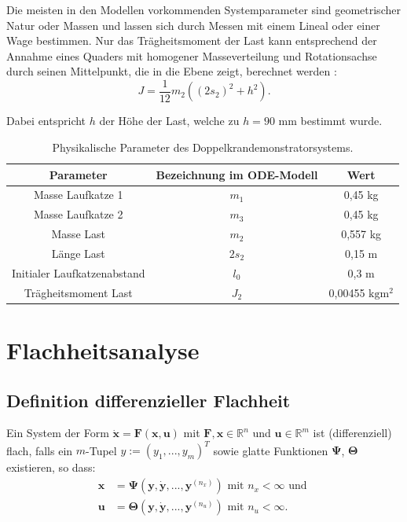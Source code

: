 Die meisten in den Modellen vorkommenden Systemparameter sind geometrischer Natur oder Massen und lassen sich durch Messen mit einem Lineal oder einer Wage bestimmen. Nur das Trägheitsmoment der Last kann entsprechend der Annahme eines Quaders mit homogener Masseverteilung und Rotationsachse durch seinen Mittelpunkt, die in die Ebene zeigt, berechnet werden \cite{LastTraegheit}:
\begin{equation}
	J = \frac{1}{12} m_2 ((2 s_2)^2 + h^2).
\end{equation}

Dabei entspricht $h$ der Höhe der Last, welche zu $h = 90$ mm
bestimmt wurde.

\begin{table}[htbp]%
	\centering
	\caption{Physikalische Parameter des Doppelkrandemonstratorsystems.}
	\label{tab:relative_degrees}
	\begin{tabular}{c c c} 
		Parameter & Bezeichnung im ODE-Modell & Wert \\ 
		\hline
		Masse Laufkatze 1 & $m_1$ & 0,45 \si{\kg} \\
		Masse Laufkatze 2 & $m_3$ & 0,45 \si{\kg} \\
 		Masse Last & $m_2$ & 0,557 \si{\kg} \\
		Länge Last & $2 s_2$ & 0,15 \si{\m} \\
		Initialer Laufkatzenabstand & $l_0$ & 0,3 \si{\m} \\
		Trägheitsmoment Last & $J_2$ & 0,00455 $\si{\kg\m^2}$ \\
		\bottomrule
	\end{tabular}
\end{table}

\chapter{Flachheitsanalyse}

\section{Definition differenzieller Flachheit}\label{sec:Def_flatness}

Ein System der Form $\dot{\mathbf{x}} = \mathbf{F}(\mathbf{x}, \mathbf{u})$ mit $\mathbf{F}, \mathbf{x} \in \mathbb{R}^n$ und $\mathbf{u} \in \mathbb{R}^m$ ist (differenziell) flach, falls ein $m$-Tupel $y := (y_1, ..., y_m)^T$ sowie glatte Funktionen $\mathbf{\Psi}$, $\mathbf{\Theta}$ existieren, so dass:
\begin{align}
\mathbf{x} &= \mathbf{\Psi}(\mathbf{y}, \dot{\mathbf{y}}, ..., \mathbf{y}^{(n_x)}) \text{ mit } n_x < \infty \text{ und } \\
\mathbf{u} &= \mathbf{\Theta}(\mathbf{y}, \dot{\mathbf{y}}, ..., \mathbf{y}^{(n_u)}) \text{ mit } n_u < \infty.
\end{align}

